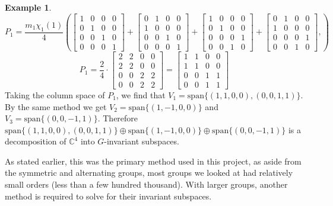 \documentclass[11pt]{article} %
\theoremstyle{definition}
\newtheorem*{example}{Example}
\theoremstyle{remark}
\newcommand{\myspan}[1]{\textrm{span} \lbrace {#1} \rbrace}
\begin{document}
\begin{example}
\[
P_1 = \frac{m_1\chi_1(1)}{4}
	\left(
	\begin{bmatrix}
	1 & 0 & 0 & 0 \\
	0 & 1 & 0 & 0 \\
	0 & 0 & 1 & 0 \\
	0 & 0 & 0 & 1
	\end{bmatrix}
	+
	\begin{bmatrix}
	0 & 1 & 0 & 0 \\
	1 & 0 & 0 & 0 \\
	0 & 0 & 1 & 0 \\
	0 & 0 & 0 & 1
	\end{bmatrix}
	+
	\begin{bmatrix}
	1 & 0 & 0 & 0 \\
	0 & 1 & 0 & 0 \\
	0 & 0 & 0 & 1 \\
	0 & 0 & 1 & 0
	\end{bmatrix}
	+
	\begin{bmatrix}
	0 & 1 & 0 & 0 \\
	1 & 0 & 0 & 0 \\
	0 & 0 & 0 & 1 \\
	0 & 0 & 1 & 0
	\end{bmatrix},
	\right)
\]
\[
P_1 = \frac{2}{4} \cdot
	\begin{bmatrix}
	2 & 2 & 0 & 0 \\
	2 & 2 & 0 & 0 \\
	0 & 0 & 2 & 2 \\
	0 & 0 & 2 & 2 
	\end{bmatrix}
	= \begin{bmatrix}
	1 & 1 & 0 & 0 \\
	1 & 1 & 0 & 0 \\
	0 & 0 & 1 & 1 \\
	0 & 0 & 1 & 1 
	\end{bmatrix}
\]
Taking the column space of $P_1$, we find that $V_1 = \myspan{(1, 1, 0, 0), (0, 0, 1, 1)}$. By the same method we get $V_2 = \myspan{(1, -1, 0, 0)}$ and $V_3 = \myspan{(0, 0, -1, 1)}$. Therefore $\myspan{(1, 1, 0, 0), (0, 0, 1, 1)} \oplus \myspan{(1, -1, 0, 0)} \oplus \myspan{(0, 0, -1, 1)}$ is a decomposition of $\mathbb{C}^4$ into $G$-invariant subspaces.
\end{example}

As stated earlier, this was the primary method used in this project, as aside from the symmetric and alternating groups, most groups we looked at had relatively small orders (less than a few hundred thousand). With larger groups, another method is required to solve for their invariant subspaces.
\end{document}
